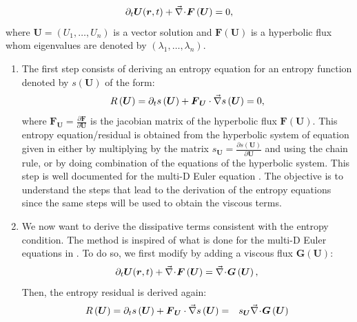 %
\begin{equation}\label{eq:hyp_syst_sct1b}
\partial_t \boldsymbol{U}(\boldsymbol r,t) + \vec{\nabla}\! \cdot \! \boldsymbol{F} \left( \boldsymbol{U} \right) = 0,
\end{equation}
%
where $\boldsymbol{U} = \left( U_1, \dots, U_n \right)$ is a vector solution and $\boldsymbol{F} \left( \boldsymbol{U} \right)$ is a hyperbolic flux whom eigenvalues are denoted by $\left( \lambda_1, \dots, \lambda_n \right)$.
\begin{enumerate}
\item The first step consists of deriving an entropy equation for an entropy function denoted by $s\left(\boldsymbol{U}\right)$ of the form: 
%
\begin{equation}
R\left(\boldsymbol{U}\right) = \partial_t s\left(\boldsymbol{U}\right) + \boldsymbol{F}_{\boldsymbol{U}} \cdot \vec{\nabla} s \left(\boldsymbol{U}\right) = 0,
\end{equation}
%
where $\boldsymbol{F}_{\boldsymbol{U}} = \frac{\partial \boldsymbol{F}}{\partial \boldsymbol{U}}$ is the jacobian matrix of the hyperbolic flux $\boldsymbol{F} \left( \boldsymbol{U} \right)$.
This entropy equation/residual is obtained from the hyperbolic system of equation given in  either by multiplying by the matrix $s_{\boldsymbol{U}} = \frac{\partial s (\boldsymbol{U})}{\partial \boldsymbol{U}}$ and using the chain rule, or by doing combination of the equations of the hyperbolic system. This step is well documented for the multi-D Euler equation \cite{Toro}. The objective is to understand the steps that lead to the derivation of the entropy equations since the same steps will be used to obtain the viscous terms.
\item We now want to derive the dissipative terms consistent with the entropy condition. The method is inspired of what is done for the multi-D Euler equations in \cite{jlg}. To do so, we first modify  by adding a viscous flux $\boldsymbol{G} \left( \boldsymbol{U} \right)$:
%
\begin{equation}\label{eq:hyp_syst2_sct1b}
\partial_t \boldsymbol{U}(\boldsymbol r,t) + \vec{\nabla}\! \cdot \! \boldsymbol{F} \left( \boldsymbol{U} \right) = \vec{\nabla}\! \cdot \! \boldsymbol{G} \left( \boldsymbol{U} \right),
\end{equation}
%
Then, the entropy residual is derived again:
%
\begin{eqnarray}\label{eq:hyp_syst3_sct1b}
R\left(\boldsymbol{U}\right) = \partial_t s\left(\boldsymbol{U}\right) + \boldsymbol{F}_{\boldsymbol{U}} \cdot \grad s \left(\boldsymbol{U}\right) &=& s_{\boldsymbol{U}} \div \boldsymbol{G} \left( \boldsymbol{U} \right) \nonumber \\

\end{eqnarray}
\end{enumerate}
